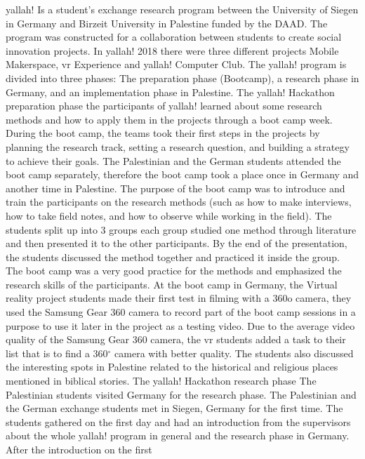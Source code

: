 \acrshort{yallah!} Is a student’s exchange research program between the University of Siegen in
Germany and Birzeit University in Palestine funded by the DAAD. The program was
constructed for a collaboration between students to create social innovation projects.
In \acrshort{yallah!} 2018 there were three different projects Mobile Makerspace, \acrshort{vr} Experience and
\acrshort{yallah!} Computer Club. The \acrshort{yallah!} program is divided into three phases: The preparation
phase (Bootcamp), a research phase in Germany, and an implementation phase in Palestine.
The \acrshort{yallah!} Hackathon preparation phase
the participants of \acrshort{yallah!} learned about some research methods and how to apply them in
the projects through a boot camp week. During the boot camp, the teams took their first
steps in the projects by planning the research track, setting a research question, and building
a strategy to achieve their goals.
The Palestinian and the German students attended the boot camp separately, therefore the
boot camp took a place once in Germany and another time in Palestine. The purpose of the
boot camp was to introduce and train the participants on the research methods (such as how
to make interviews, how to take field notes, and how to observe while working in the field).
The students split up into 3 groups each group studied one method through literature and
then presented it to the other participants. By the end of the presentation, the students
discussed the method together and practiced it inside the group. The boot camp was a very
good practice for the methods and emphasized the research skills of the participants. At the
boot camp in Germany, the Virtual reality project students made their first test in filming with
a 360o camera, they used the Samsung Gear 360 camera to record part of the boot camp
sessions in a purpose to use it later in the project as a testing video. Due to the average video
quality of the Samsung Gear 360 camera, the \acrshort{vr} students added a task to their list that is to
find a 360$^{\circ}$ camera with better quality. The students also discussed the interesting spots in
Palestine related to the historical and religious places mentioned in biblical stories.
The \acrshort{yallah!} Hackathon research phase
The Palestinian students visited Germany for the research phase. The Palestinian and the
German exchange students met in Siegen, Germany for the first time. The students gathered
on the first day and had an introduction from the supervisors about the whole \acrshort{yallah!}
program in general and the research phase in Germany. After the introduction on the first
